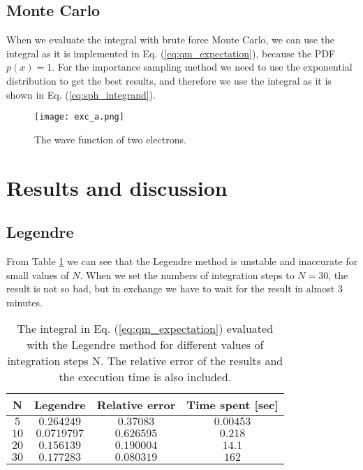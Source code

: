 \documentclass[12pt]{article}
\begin{document}
\begin{flushleft}
\subsection{Monte Carlo}
When we evaluate the integral with brute force Monte Carlo, we can use the integral as it is implemented in Eq. (\ref{eq:qm_expectation}), because the PDF $p(x) = 1$. For the importance sampling method we need to use the exponential distribution to get the best results, and therefore we use the integral as it is shown in Eq. (\ref{eq:sph_integrand}).
\newpage
\begin{figure}[!h]
\begin{center}
\texttt{[image: exc\_a.png]}
\caption{\label{fig:limits}The wave function of two electrons.}
\end{center}
\end{figure}
\newpage
\section{Results and discussion}
\subsection{Legendre}
From Table \ref{tab:legendre} we can see that the Legendre method is unstable and inaccurate for small values of $N$. When we set the numbers of integration steps to $N=30$, the result is not so bad, but in exchange we have to wait for the result in almost $3$ minutes.
\vspace{5mm}
\begin{table}[!h]
\begin{center}
\begin{tabular}{| c | c | c | c |}
	\hline
	\textbf{N}  & \textbf{Legendre} &  \textbf{Relative error} & \textbf{Time spent [sec]}\\
	\hline		
	$5$ & $0.264249$ & $0.37083$ & $0.00453$ \\
    $10$ & $0.0719797$ & $0.626595$ & $0.218$\\
    $20$ & $0.156139$ & $0.190004$ & $14.1$\\
    $30$ & $0.177283$ & $0.080319$ & $162$\\
  \hline
\end{tabular}
\end{center}
\caption{\label{tab:legendre}The integral in Eq. (\ref{eq:qm_expectation}) evaluated with the Legendre method for different values of integration steps N. The relative error of the results and the execution time is also included.}
\end{table}


\end{flushleft}
\end{document}

